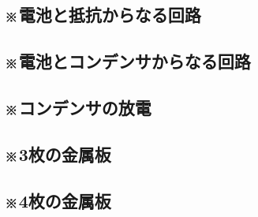 \documentclass[../../uem_phy_std_a.tex]{subfiles}
\begin{document}
    \subsection{※電池と抵抗からなる回路}
        
        \vspace{20pt}    
        \vfill
    \subsection{※電池とコンデンサからなる回路}
        
        \vspace{20pt}    
        \vfill
    \subsection{※コンデンサの放電}
        
        \vspace{20pt}    
        \vfill
    \subsection{※3枚の金属板}
        
        \vspace{20pt}    
        \vfill
    \subsection{※4枚の金属板}
        
        \vspace{20pt}    
        \vfill
\end{document}

